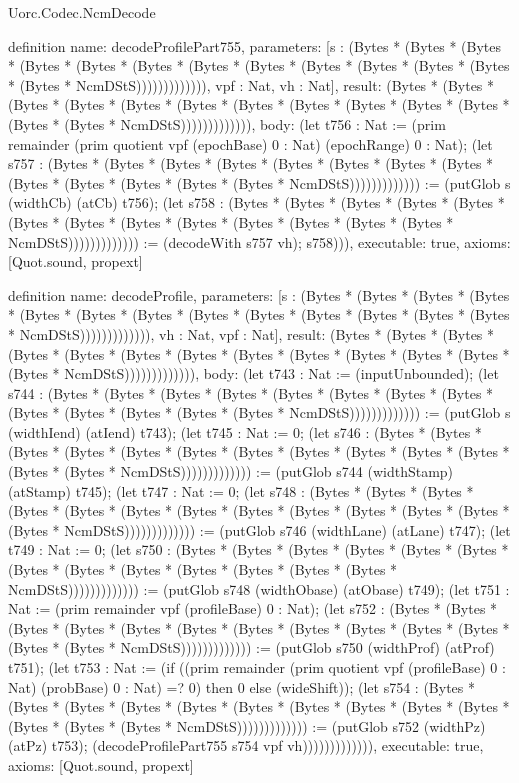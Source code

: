 \begin{lexlean}{Uorc.Codec.NcmDecode}
\begin{semanticmodule}
definition{
  name: decodeProfilePart755,
  parameters: [s : (Bytes * (Bytes * (Bytes * (Bytes * (Bytes * (Bytes * (Bytes * (Bytes * (Bytes * (Bytes * (Bytes * (Bytes * (Bytes * NcmDStS))))))))))))), vpf : Nat, vh : Nat],
  result: (Bytes * (Bytes * (Bytes * (Bytes * (Bytes * (Bytes * (Bytes * (Bytes * (Bytes * (Bytes * (Bytes * (Bytes * (Bytes * NcmDStS))))))))))))),
  body: (let t756 : Nat := (prim remainder (prim quotient vpf (epochBase) 0 : Nat) (epochRange) 0 : Nat); (let s757 : (Bytes * (Bytes * (Bytes * (Bytes * (Bytes * (Bytes * (Bytes * (Bytes * (Bytes * (Bytes * (Bytes * (Bytes * (Bytes * NcmDStS))))))))))))) := (putGlob s (widthCb) (atCb) t756); (let s758 : (Bytes * (Bytes * (Bytes * (Bytes * (Bytes * (Bytes * (Bytes * (Bytes * (Bytes * (Bytes * (Bytes * (Bytes * (Bytes * NcmDStS))))))))))))) := (decodeWith s757 vh); s758))),
  executable: true,
  axioms: [Quot.sound, propext]
}

definition{
  name: decodeProfile,
  parameters: [s : (Bytes * (Bytes * (Bytes * (Bytes * (Bytes * (Bytes * (Bytes * (Bytes * (Bytes * (Bytes * (Bytes * (Bytes * (Bytes * NcmDStS))))))))))))), vh : Nat, vpf : Nat],
  result: (Bytes * (Bytes * (Bytes * (Bytes * (Bytes * (Bytes * (Bytes * (Bytes * (Bytes * (Bytes * (Bytes * (Bytes * (Bytes * NcmDStS))))))))))))),
  body: (let t743 : Nat := (inputUnbounded); (let s744 : (Bytes * (Bytes * (Bytes * (Bytes * (Bytes * (Bytes * (Bytes * (Bytes * (Bytes * (Bytes * (Bytes * (Bytes * (Bytes * NcmDStS))))))))))))) := (putGlob s (widthIend) (atIend) t743); (let t745 : Nat := 0; (let s746 : (Bytes * (Bytes * (Bytes * (Bytes * (Bytes * (Bytes * (Bytes * (Bytes * (Bytes * (Bytes * (Bytes * (Bytes * (Bytes * NcmDStS))))))))))))) := (putGlob s744 (widthStamp) (atStamp) t745); (let t747 : Nat := 0; (let s748 : (Bytes * (Bytes * (Bytes * (Bytes * (Bytes * (Bytes * (Bytes * (Bytes * (Bytes * (Bytes * (Bytes * (Bytes * (Bytes * NcmDStS))))))))))))) := (putGlob s746 (widthLane) (atLane) t747); (let t749 : Nat := 0; (let s750 : (Bytes * (Bytes * (Bytes * (Bytes * (Bytes * (Bytes * (Bytes * (Bytes * (Bytes * (Bytes * (Bytes * (Bytes * (Bytes * NcmDStS))))))))))))) := (putGlob s748 (widthObase) (atObase) t749); (let t751 : Nat := (prim remainder vpf (profileBase) 0 : Nat); (let s752 : (Bytes * (Bytes * (Bytes * (Bytes * (Bytes * (Bytes * (Bytes * (Bytes * (Bytes * (Bytes * (Bytes * (Bytes * (Bytes * NcmDStS))))))))))))) := (putGlob s750 (widthProf) (atProf) t751); (let t753 : Nat := (if ((prim remainder (prim quotient vpf (profileBase) 0 : Nat) (probBase) 0 : Nat) =? 0) then 0 else (wideShift)); (let s754 : (Bytes * (Bytes * (Bytes * (Bytes * (Bytes * (Bytes * (Bytes * (Bytes * (Bytes * (Bytes * (Bytes * (Bytes * (Bytes * NcmDStS))))))))))))) := (putGlob s752 (widthPz) (atPz) t753); (decodeProfilePart755 s754 vpf vh))))))))))))),
  executable: true,
  axioms: [Quot.sound, propext]
}


\end{semanticmodule}
\end{lexlean}
